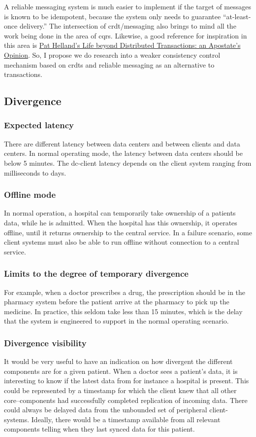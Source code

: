 \documentclass[11pt,a4paper]{report}
\begin{document}
A reliable messaging system is much easier to implement if the target of messages is known to be idempotent, because the system only needs to guarantee ``at-least-once delivery.''
The intersection of \gls{crdt}/messaging also brings to mind all the work being done in the area of \gls{cqrs}. Likewise, a good reference for inspiration in this area is \hyperlink{http://www.ics.uci.edu/~cs223/papers/cidr07p15.pdf}{Pat Helland's Life beyond Distributed Transactions: an Apostate's Opinion}. So, I propose we do research into a weaker consistency control mechanism based on \glspl{crdt} and reliable messaging as an alternative to transactions.

\subsection{Divergence}
\subsubsection{Expected latency}
There are different latency between data centers and between clients and data centers.
In normal operating mode, the latency between data centers should be below 5 minutes.
The \gls{dc}-client latency depends on the client system ranging from milliseconds to days.
\subsubsection{Offline mode}
In normal operation, a hospital can temporarily take ownership of a patients data, while he is admitted. When the hospital has this ownership, it operates offline, until it returns ownership to the central service.
In a failure scenario, some client systems must also be able to run offline without connection to a central service.
\subsubsection{Limits to the degree of temporary divergence}
For example, when a doctor prescribes a drug, the prescription should be in the pharmacy system before the patient arrive at the pharmacy to pick up the medicine. In practice, this seldom take less than 15 minutes, which is the delay that the system is engineered to support in the normal operating scenario.
\subsubsection{Divergence visibility}
It would be very useful to have an indication on how divergent the different components are for a given patient. When a doctor sees a patient's data, it is interesting to know if the latest data from for instance a hospital is present.
This could be represented by a timestamp for which the client knew that all other core--components had successfully completed replication of incoming data. 
There could always be delayed data from the unbounded set of peripheral client-systems. Ideally, there would be a timestamp available from all relevant components telling when they last synced data for this patient.
\end{document}
